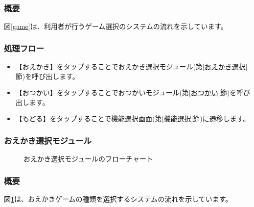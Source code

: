 \documentclass[a4j]{jarticle}
\begin{document}
\subsubsection*{概要}
 図\ref{game}は、利用者が行うゲーム選択のシステムの流れを示しています。

\subsubsection*{処理フロー}
\begin{itemize}
\item 【おえかき】をタップすることでおえかき選択モジュール(第\ref{おえかき選択}節)を呼び出します。
\item 【おつかい】をタップすることでおつかいモジュール(第\ref{おつかい}節)を呼び出します。
\item 【もどる】をタップすることで機能選択画面(第\ref{機能選択}節)に遷移します。
\end{itemize}

\newpage

\subsubsection{おえかき選択モジュール\label{おえかき選択}}
\begin{figure}[H]
    \begin{center}
    \caption {おえかき選択モジュールのフローチャート}
    \label{oekaki}
    \end{center}
\end{figure}

\subsubsection*{概要}
 図\ref{oekaki}は、おえかきゲームの種類を選択するシステムの流れを示しています。
\end{document}

